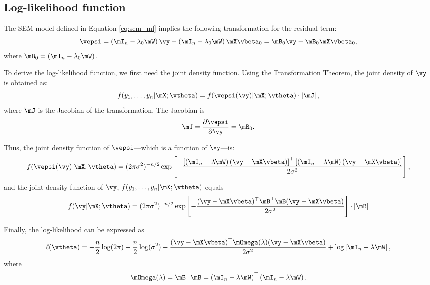 \documentclass[english,12pt]{book}\usepackage[]{graphicx}\usepackage[]{xcolor}
\begin{document}
\subsection{Log-likelihood function}

The SEM model defined in Equation \eqref{eq:sem_ml} implies the following transformation for the residual term:
\begin{equation*}
\vepsi = \left(\mI_n-\lambda_0\mW\right)\vy - \left(\mI_n-\lambda_0\mW\right)\mX\vbeta_0 = \mB_0\vy - \mB_0\mX\vbeta_0,
\end{equation*}
%
where $\mB_0 = (\mI_n-\lambda_0\mW)$. 

To derive the log-likelihood function, we first need the joint density function. Using the Transformation Theorem, the joint density of $\vy$ is obtained as:
\begin{equation*}
  f(y_1,\ldots ,y_n|\mX; \vtheta) = f(\vepsi(\vy)| \mX ; \vtheta) \cdot \left|\mJ\right|, 
\end{equation*}
%
where $\mJ$ is the Jacobian of the transformation. The Jacobian is
\begin{equation*}
\mJ = \frac{\partial \vepsi}{\partial \vy} =\mB_0.
\end{equation*}

Thus, the joint density function of $\vepsi$---which is a function of $\vy$---is:
\begin{equation*}
  f(\vepsi(\vy)| \mX ; \vtheta) = (2\pi \sigma^2)^{-n/2}\exp\left[- \frac{\left[\left(\mI_n-\lambda\mW\right)(\vy - \mX\vbeta)\right]^\top \left[\left(\mI_n-\lambda\mW\right)(\vy - \mX\vbeta)\right]}{2\sigma^2}\right],
\end{equation*}
%
and the joint density function of $\vy$, $f(y_1,\ldots,y_n|\mX; \vtheta)$ equals
\begin{equation*}
  f(\vy| \mX ; \vtheta) = (2\pi \sigma^2)^{-n/2}\exp\left[- \frac{(\vy - \mX\vbeta)^\top \mB^\top \mB (\vy - \mX\vbeta)}{2\sigma^2}\right]\cdot \left|\mB\right|
\end{equation*}

Finally, the log-likelihood can be expressed as
\begin{equation}\label{eq:ll_sem}
\ell(\vtheta) = - \frac{n}{2}\log(2\pi) - \frac{n}{2}\log(\sigma^2)-\frac{(\vy - \mX\vbeta)^\top \mOmega(\lambda) (\vy - \mX\vbeta)}{2\sigma^2} + \log\left|\mI_n - \lambda \mW\right|,
\end{equation}
%
where 
\begin{equation*}
\mOmega(\lambda) = \mB^\top \mB = \left(\mI_n-\lambda\mW\right)^\top \left(\mI_n-\lambda\mW\right).
\end{equation*}
\end{document}
